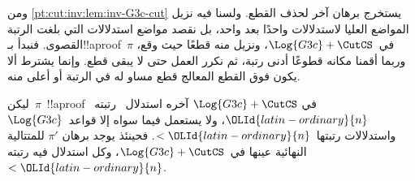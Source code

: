 \documentclass[../../../include/open-logic-section]{subfiles}
\begin{document}
ومن \cref{pt:cut:inv:lem:inv-G3c-cut} يستخرج برهان آخر لحذف القطع. ولسنا
فيه نزيل المواضع العليا لاستدلالات \CutCS{} واحدًا بعد واحد، بل نقصد
مواضع استدلالات \CutCS{} التي بلغت الرتبة القصوى. فنبدأ بـ!!a{proof}~$\pi$
في~$\Log{G3c} + \CutCS$، ونزيل منه قطعًا حيث وقع، وربما أقمنا مكانه قطوعًا
أدنى رتبة، ثم نكرر العمل حتى لا يبقى قطع. وإنما يشترط ألا يكون فوق القطع
المعالج قطع مساو له في الرتبة أو أعلى منه.

\begin{lem} ليكن~$\pi$~!!a{proof} في
$\Log{G3c}+\CutCS$ آخره استدلال~\CutCS{} رتبته~$\OLId{latin-ordinary}{n}$، ولا يستعمل فيما سواه
إلا قواعد~$\Log{G3c}$ واستدلالات \CutCS{} رتبتها~$<\OLId{latin-ordinary}{n}$. فحينئذ يوجد برهان
$\pi'$ للمتتالية النهائية عينها في~$\Log{G3c} + \CutCS$، وكل استدلال
\CutCS{} فيه رتبته~$<\OLId{latin-ordinary}{n}$.
\end{lem}
\end{document}
